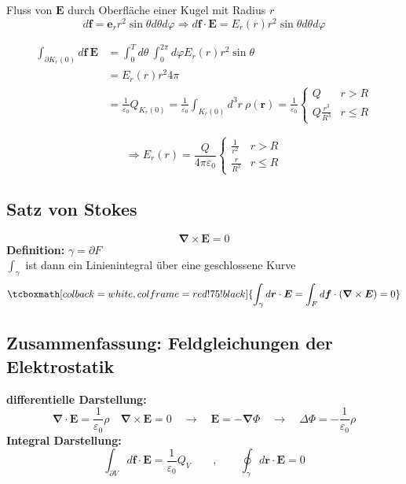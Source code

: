 \documentclass[titlepage,11pt,a4paper,ngerman]{report}
\newcommand{\intt}[2]{\int_{#1}^{#2}}
\renewcommand{\vec}[1]{\boldsymbol{#1}}
\renewcommand{\epsilon}{\varepsilon}
\newcommand{\rmbox}[1]{\tcboxmath[colback=white,colframe=red!75!black]{#1}}
\begin{document}
Fluss von $\vec{E}$ durch Oberfläche einer Kugel mit Radius $r$ %
$$d \vec{f} = \vec{e}_r r^2 \sin \theta d \theta d \varphi \Rightarrow d \vec{f} \cdot \vec{E} = E_r(r)r^2\sin \theta d \theta d \varphi $$

\begin{align*}
\int_{\partial K_r (0)} d\vec{f}\ \vec{E} &= \int_0^T d \theta \ \intt{0}{2 \pi} d \varphi E_r (r) r^2 \sin \theta\\
&= E_r (r) r^2 4 \pi\\
&= \frac{1}{\epsilon_0} Q_{K_r (0)} = \frac{1}{\epsilon_0} \int_{K_r (0)} d^3 r\ \rho(\vec{r}) = \frac{1}{\epsilon_0} \left\{ \begin{array}{cc}
Q & r > R\\
Q \frac{r^3}{R^3} & r \leq R 		
\end{array}\right.
\end{align*}

$$\Rightarrow E_r(r) = \frac{Q}{4 \pi \epsilon_0}\left\{ \begin{array}{cc}
\frac{1}{r^2} & r > R\\
\frac{r}{R^3} & r \leq R 		
\end{array}\right.$$ %

\subsection{Satz von Stokes}
\begin{equation*}
\vec{\nabla} \times \vec{E} = 0
\end{equation*}
\textbf{Definition:} $ \gamma = \partial F $\\
$ \int_\gamma $ ist dann ein Linienintegral über eine geschlossene Kurve
\begin{equation*}
\rmbox{\int_\gamma d \vec{r} \cdot \vec{E} = \int_F d\vec{f} \cdot (\vec{\nabla} \times \vec{E}) = 0}
\end{equation*}

\subsection{Zusammenfassung: Feldgleichungen der Elektrostatik}

\textbf{differentielle Darstellung:}
\begin{equation*}
\vec{\nabla}\cdot \vec{E} = \frac{1}{\epsilon_0} \rho \quad \vec{\nabla} \times \vec{E} = 0 \quad \rightarrow \quad \vec{E} = - \vec{\nabla} \Phi \quad \rightarrow \quad \Delta \Phi = - \frac{1}{\epsilon_0} \rho
\end{equation*}
\textbf{Integral Darstellung:}
\begin{equation*}
\int_{\partial V} d\vec{f} \cdot \vec{E} = \frac{1}{\epsilon_0} Q_V \qquad , \qquad \oint_\gamma d\vec{r} \cdot \vec{E} = 0
\end{equation*}
\end{document}
